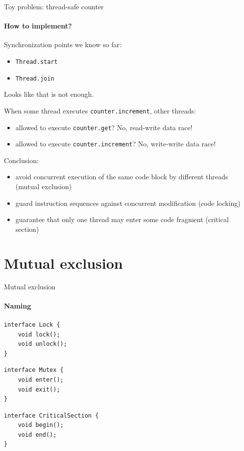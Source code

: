 
\begin{frame}[t,noframenumbering]{Toy problem: thread-safe counter}
\framesubtitle{How to implement?}

Synchronization points we know so far:
\begin{itemize}
    \item \texttt{Thread.start}
    \item \texttt{Thread.join}
\end{itemize}

Looks like that is not enough.

\pause
When some thread executes \texttt{counter.increment}, other threads:
\begin{itemize}
        \item allowed to execute \texttt{counter.get}? \pause No, read-write data race!
        \pause
        \item allowed to execute \texttt{counter.increment}? \pause No, write-write data race!
\end{itemize}

\pause
Conclusion: 
\begin{itemize}
  \item avoid concurrent execution of the same code block by different threads (mutual exclusion)
  \pause
  \item guard instruction sequences against concurrent modification (code locking)
  \pause
  \item guarantee that only one thread may enter some code fragment (critical section)
\end{itemize}
\end{frame}

\section{Mutual exclusion}
\showTOC

\begin{frame}[fragile]{Mutual exclusion}
\framesubtitle{Naming}

\begin{verbatim}
interface Lock {
    void lock();
    void unlock();
}
\end{verbatim}

\pause

\begin{verbatim}
interface Mutex {
    void enter();
    void exit();
}
\end{verbatim}

\pause

\begin{verbatim}
interface CriticalSection {
    void begin();
    void end();
}
\end{verbatim}
\end{frame}


